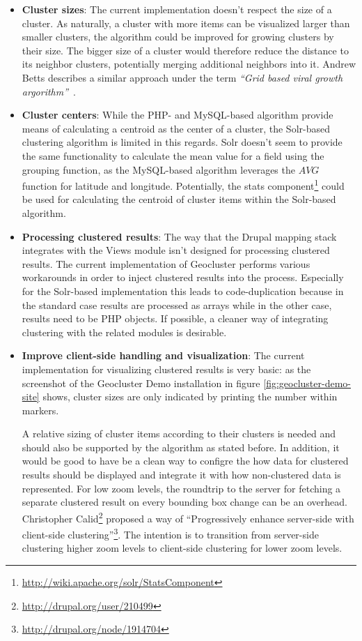\begin{itemize}

\item \textbf{Cluster sizes}: The current implementation doesn't respect the size of a cluster. As naturally, a cluster with more items can be visualized larger than smaller clusters, the algorithm could be improved for growing clusters by their size. The bigger size of a cluster would therefore reduce the distance to its neighbor clusters, potentially merging additional neighbors into it. Andrew Betts describes a similar approach under the term \textit{``Grid based viral growth argorithm''}~\cite{web:clustering-google}.

\item \textbf{Cluster centers}: While the PHP- and MySQL-based algorithm provide means of calculating a centroid as the center of a cluster, the Solr-based clustering algorithm is limited in this regards. Solr doesn't seem to provide the same functionality to calculate the mean value for a field using the grouping function, as the MySQL-based algorithm leverages the $AVG$ function for latitude and longitude. Potentially, the stats component\footnote{\url{http://wiki.apache.org/solr/StatsComponent}} could be used for calculating the centroid of cluster items within the Solr-based algorithm.

\item \textbf{Processing clustered results}: The way that the Drupal mapping stack integrates with the Views module isn't designed for processing clustered results. The current implementation of Geocluster performs various workarounds in order to inject clustered results into the process. Especially for the Solr-based implementation this leads to code-duplication because in the standard case results are processed as arrays while in the other case, results need to be PHP objects. If possible, a cleaner way of integrating clustering with the related modules is desirable.   

\item \textbf{Improve client-side handling and visualization}: The current implementation for visualizing clustered results is very basic: as the screenshot of the Geocluster Demo installation in figure \ref{fig:geocluster-demo-site} shows, cluster sizes are only indicated by printing the number within markers. 

 A relative sizing of cluster items according to their clusters is needed and should also be supported by the algorithm as stated before. In addition, it would be good to have be a clean way to configre the how data for clustered results should be displayed and integrate it with how non-clustered data is represented. For low zoom levels, the roundtrip to the server for fetching a separate clustered result on every bounding box change can be an overhead. Christopher Calid\footnote{\url{http://drupal.org/user/210499}} proposed a way of ``Progressively enhance server-side with client-side clustering''\footnote{\url{http://drupal.org/node/1914704}}. The intention is to transition from server-side clustering higher zoom levels to client-side clustering for lower zoom levels.

\end{itemize}







